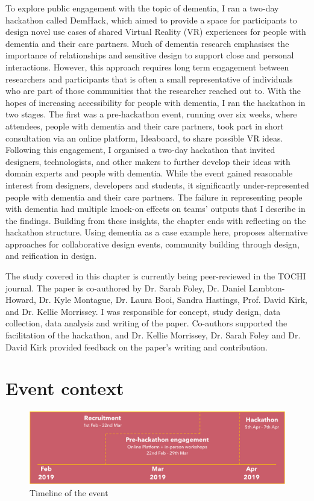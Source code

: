 To explore public engagement with the topic of dementia, I ran a two-day hackathon called DemHack, which aimed to provide a space for participants to design novel use cases of shared Virtual Reality (VR) experiences for people with dementia and their care partners. Much of dementia research emphasises the importance of relationships and sensitive design to support close and personal interactions. However, this approach requires long term engagement between researchers and participants that is often a small representative of individuals who are part of those communities that the researcher reached out to. With the hopes of increasing accessibility for people with dementia, I ran the hackathon in two stages. The first was a pre-hackathon event, running over six weeks, where attendees, people with dementia and their care partners, took part in short consultation via an online platform, Ideaboard, to share possible VR ideas. Following this engagement, I organised a two-day hackathon that invited designers, technologists, and other makers to further develop their ideas with domain experts and people with dementia. While the event gained reasonable interest from designers, developers and students, it significantly under-represented people with dementia and their care partners. The failure in representing people with dementia had multiple knock-on effects on teams' outputs that I describe in the findings. Building from these insights, the chapter ends with reflecting on the hackathon structure. Using dementia as a case example here, proposes alternative approaches for collaborative design events, community building through design, and reification in design.

The study covered in this chapter is currently being peer-reviewed in the TOCHI journal. The paper is co-authored by Dr. Sarah Foley, Dr. Daniel Lambton-Howard, Dr. Kyle Montague, Dr. Laura Booi, Sandra Hastings, Prof. David Kirk, and Dr. Kellie Morrissey. I was responsible for concept, study design, data collection, data analysis and writing of the paper. Co-authors supported the facilitation of the hackathon, and Dr. Kellie Morrissey, Dr. Sarah Foley and Dr. David Kirk provided feedback on the paper's writing and contribution.

\section{Event context}
\label{sec:DemVRContextEvent}

\begin{figure}[htp]
\centering
\includegraphics[width=.8\linewidth]{Images/DemVR/Timeline.jpg}
\caption{Timeline of the event}
\label{fig:DemVRTimeline}
\end{figure}

